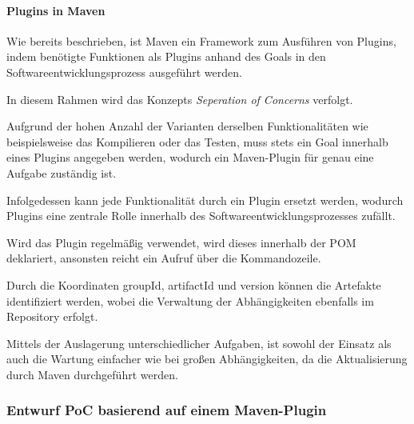 \paragraph{Plugins in Maven}

Wie bereits beschrieben, ist Maven ein Framework zum Ausführen von Plugins, indem benötigte Funktionen als Plugins anhand des Goals in den Softwareentwicklungsprozess ausgeführt werden.

In diesem Rahmen wird das Konzepts \textit{Seperation of Concerns} verfolgt. 

Aufgrund der hohen Anzahl der Varianten derselben Funktionalitäten wie beispielsweise das Kompilieren oder das Testen, muss stets ein Goal innerhalb eines Plugins angegeben werden, wodurch ein Maven-Plugin für genau eine Aufgabe zuständig ist. 

Infolgedessen kann jede Funktionalität durch ein Plugin ersetzt werden, wodurch Plugins eine zentrale Rolle innerhalb des Softwareentwicklungsprozesses zufällt. 

Wird das Plugin regelmäßig verwendet, wird dieses innerhalb der POM deklariert, ansonsten reicht ein Aufruf über die Kommandozeile.  

Durch die Koordinaten groupId, artifactId und version können die Artefakte identifiziert werden, wobei die Verwaltung der Abhängigkeiten ebenfalls im Repository erfolgt. 

Mittels der Auslagerung unterschiedlicher Aufgaben, ist sowohl der Einsatz als auch die Wartung einfacher wie bei großen Abhängigkeiten, da die Aktualisierung durch Maven durchgeführt werden.  

\subsubsection{Entwurf PoC basierend auf einem Maven-Plugin}




